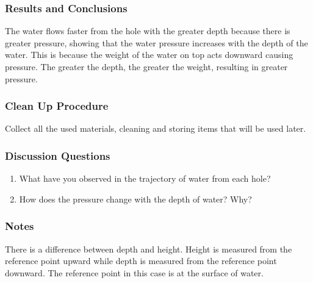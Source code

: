 \subsubsection*{Results and Conclusions}
The water flows faster from the hole with the greater depth because there is greater pressure, showing that the water pressure increases with the depth of the water. This is because the weight of the water on top acts downward causing pressure. The greater the depth, the greater the weight, resulting in greater pressure. 

\subsubsection*{Clean Up Procedure}
Collect all the used materials, cleaning and storing items that will be used later.

\subsubsection*{Discussion Questions}
\begin{enumerate}
\item{What have you observed in the trajectory of water from each hole?}
\item{How does the pressure change with the depth of water? Why?}
\end{enumerate}

\subsubsection*{Notes}
There is a difference between depth and height. Height is measured from the reference point upward while depth is measured from the reference point downward. The reference point in this case is at the surface of water. 
	

	
